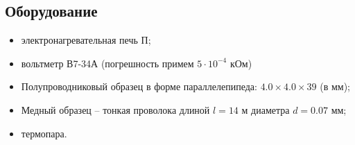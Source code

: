 \subsection*{Оборудование}

\begin{itemize}
    \item электронагревательная печь П;
    \item вольтметр В7-34А (погрешность примем $5\cdot10^{-4}$ кОм) 
    \item Полупроводниковый образец в форме параллелепипеда: $4.0 \times 4.0 \times 39$ (в мм);
    \item  Медный образец -- тонкая проволока длиной $l = 14$ м диаметра $d = 0.07$ мм;
    \item термопара.
\end{itemize}





